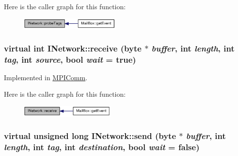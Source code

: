 Here is the caller graph for this function:\nopagebreak
\begin{figure}[H]
\begin{center}
\leavevmode
\includegraphics[width=143pt]{class_i_network_a85b398c3932251d6c0d9698004eb01e7_icgraph}
\end{center}
\end{figure}
\hypertarget{class_i_network_a6578b7160209dfc342be9b5658621625}{
\subsubsection[{receive}]{\setlength{\rightskip}{0pt plus 5cm}virtual int INetwork::receive ({\bf byte} $\ast$ {\em buffer}, \/  int {\em length}, \/  int {\em tag}, \/  int {\em source}, \/  bool {\em wait} = {\ttfamily true})}}
\label{class_i_network_a6578b7160209dfc342be9b5658621625}


Implemented in \hyperlink{class_m_p_i_comm_abdd86a365a50571e7a46e8593c45977b}{MPIComm}.

Here is the caller graph for this function:\nopagebreak
\begin{figure}[H]
\begin{center}
\leavevmode
\includegraphics[width=136pt]{class_i_network_a6578b7160209dfc342be9b5658621625_icgraph}
\end{center}
\end{figure}
\hypertarget{class_i_network_a4996a6c20805f604c5afff707313ed4e}{
\subsubsection[{send}]{\setlength{\rightskip}{0pt plus 5cm}virtual unsigned long INetwork::send ({\bf byte} $\ast$ {\em buffer}, \/  int {\em length}, \/  int {\em tag}, \/  int {\em destination}, \/  bool {\em wait} = {\ttfamily false})}}
\label{class_i_network_a4996a6c20805f604c5afff707313ed4e}


